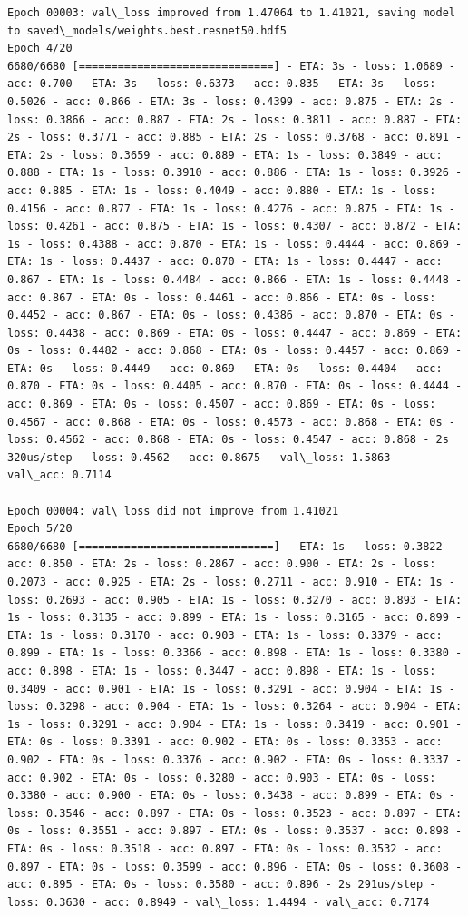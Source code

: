 \documentclass[11pt]{article}
\begin{document}
\begin{Verbatim}[commandchars=\\\{\}]
Epoch 00003: val\_loss improved from 1.47064 to 1.41021, saving model to saved\_models/weights.best.resnet50.hdf5
Epoch 4/20
6680/6680 [==============================] - ETA: 3s - loss: 1.0689 - acc: 0.700 - ETA: 3s - loss: 0.6373 - acc: 0.835 - ETA: 3s - loss: 0.5026 - acc: 0.866 - ETA: 3s - loss: 0.4399 - acc: 0.875 - ETA: 2s - loss: 0.3866 - acc: 0.887 - ETA: 2s - loss: 0.3811 - acc: 0.887 - ETA: 2s - loss: 0.3771 - acc: 0.885 - ETA: 2s - loss: 0.3768 - acc: 0.891 - ETA: 2s - loss: 0.3659 - acc: 0.889 - ETA: 1s - loss: 0.3849 - acc: 0.888 - ETA: 1s - loss: 0.3910 - acc: 0.886 - ETA: 1s - loss: 0.3926 - acc: 0.885 - ETA: 1s - loss: 0.4049 - acc: 0.880 - ETA: 1s - loss: 0.4156 - acc: 0.877 - ETA: 1s - loss: 0.4276 - acc: 0.875 - ETA: 1s - loss: 0.4261 - acc: 0.875 - ETA: 1s - loss: 0.4307 - acc: 0.872 - ETA: 1s - loss: 0.4388 - acc: 0.870 - ETA: 1s - loss: 0.4444 - acc: 0.869 - ETA: 1s - loss: 0.4437 - acc: 0.870 - ETA: 1s - loss: 0.4447 - acc: 0.867 - ETA: 1s - loss: 0.4484 - acc: 0.866 - ETA: 1s - loss: 0.4448 - acc: 0.867 - ETA: 0s - loss: 0.4461 - acc: 0.866 - ETA: 0s - loss: 0.4452 - acc: 0.867 - ETA: 0s - loss: 0.4386 - acc: 0.870 - ETA: 0s - loss: 0.4438 - acc: 0.869 - ETA: 0s - loss: 0.4447 - acc: 0.869 - ETA: 0s - loss: 0.4482 - acc: 0.868 - ETA: 0s - loss: 0.4457 - acc: 0.869 - ETA: 0s - loss: 0.4449 - acc: 0.869 - ETA: 0s - loss: 0.4404 - acc: 0.870 - ETA: 0s - loss: 0.4405 - acc: 0.870 - ETA: 0s - loss: 0.4444 - acc: 0.869 - ETA: 0s - loss: 0.4507 - acc: 0.869 - ETA: 0s - loss: 0.4567 - acc: 0.868 - ETA: 0s - loss: 0.4573 - acc: 0.868 - ETA: 0s - loss: 0.4562 - acc: 0.868 - ETA: 0s - loss: 0.4547 - acc: 0.868 - 2s 320us/step - loss: 0.4562 - acc: 0.8675 - val\_loss: 1.5863 - val\_acc: 0.7114

Epoch 00004: val\_loss did not improve from 1.41021
Epoch 5/20
6680/6680 [==============================] - ETA: 1s - loss: 0.3822 - acc: 0.850 - ETA: 2s - loss: 0.2867 - acc: 0.900 - ETA: 2s - loss: 0.2073 - acc: 0.925 - ETA: 2s - loss: 0.2711 - acc: 0.910 - ETA: 1s - loss: 0.2693 - acc: 0.905 - ETA: 1s - loss: 0.3270 - acc: 0.893 - ETA: 1s - loss: 0.3135 - acc: 0.899 - ETA: 1s - loss: 0.3165 - acc: 0.899 - ETA: 1s - loss: 0.3170 - acc: 0.903 - ETA: 1s - loss: 0.3379 - acc: 0.899 - ETA: 1s - loss: 0.3366 - acc: 0.898 - ETA: 1s - loss: 0.3380 - acc: 0.898 - ETA: 1s - loss: 0.3447 - acc: 0.898 - ETA: 1s - loss: 0.3409 - acc: 0.901 - ETA: 1s - loss: 0.3291 - acc: 0.904 - ETA: 1s - loss: 0.3298 - acc: 0.904 - ETA: 1s - loss: 0.3264 - acc: 0.904 - ETA: 1s - loss: 0.3291 - acc: 0.904 - ETA: 1s - loss: 0.3419 - acc: 0.901 - ETA: 0s - loss: 0.3391 - acc: 0.902 - ETA: 0s - loss: 0.3353 - acc: 0.902 - ETA: 0s - loss: 0.3376 - acc: 0.902 - ETA: 0s - loss: 0.3337 - acc: 0.902 - ETA: 0s - loss: 0.3280 - acc: 0.903 - ETA: 0s - loss: 0.3380 - acc: 0.900 - ETA: 0s - loss: 0.3438 - acc: 0.899 - ETA: 0s - loss: 0.3546 - acc: 0.897 - ETA: 0s - loss: 0.3523 - acc: 0.897 - ETA: 0s - loss: 0.3551 - acc: 0.897 - ETA: 0s - loss: 0.3537 - acc: 0.898 - ETA: 0s - loss: 0.3518 - acc: 0.897 - ETA: 0s - loss: 0.3532 - acc: 0.897 - ETA: 0s - loss: 0.3599 - acc: 0.896 - ETA: 0s - loss: 0.3608 - acc: 0.895 - ETA: 0s - loss: 0.3580 - acc: 0.896 - 2s 291us/step - loss: 0.3630 - acc: 0.8949 - val\_loss: 1.4494 - val\_acc: 0.7174


\end{Verbatim}
\end{document}
